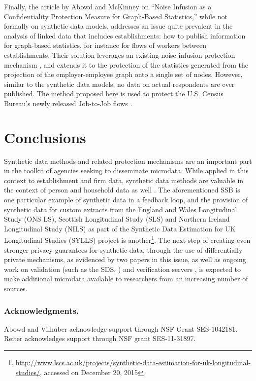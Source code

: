 \documentclass[article,letter]{llncs}
\begin{document}
Finally, the article by Abowd and McKinney on ``Noise Infusion 
as a Confidentiality Protection Measure for Graph-Based Statistics,'' while not formally on synthetic data models, addresses an issue quite prevalent in the analysis of linked data that includes establishments: how to publish information for graph-based statistics, for instance for flows of workers between establishments. Their solution leverages an existing noise-infusion protection mechanism \cite{AbowdEtAl2009}, and extends it to the protection of the statistics generated from the projection of the employer-employee graph onto a single set of nodes. However, similar to the synthetic data models, no data on actual respondents are ever published. The method proposed here is used to protect the U.S. Census Bureau's newly released Job-to-Job flows \cite{J2j-long}. 



\section{Conclusions}

Synthetic data methods and related protection mechanisms are an important part in the toolkit of agencies seeking to disseminate microdata. While applied in this context to establishment and firm data, synthetic data methods are valuable in the context of person and household data as well  \cite{RePEc:bes:jnlasa:v:105:i:492:y:2010:p:1347-1357,2014arXiv1412.2282H}. 
The aforementioned \ac{SSB} \cite{ssafinal} is one particular example of synthetic data in a feedback loop, and the provision of synthetic data for custom extracts from the England and Wales Longitudinal Study (ONS LS), Scottish Longitudinal Study (SLS) and Northern Ireland Longitudinal Study (NILS) as part of the Synthetic Data Estimation for UK Longitudinal Studies (SYLLS) project is another\footnote{\url{http://www.lscs.ac.uk/projects/synthetic-data-estimation-for-uk-longitudinal-studies/}, accessed on December 20, 2015}. The next step of creating even stronger privacy guarantees for synthetic data, through the use of differentially private mechanisms, as evidenced by two papers in this issue, as well as ongoing work on validation (such as the \ac{SDS}, \cite{AbowdVilhuber2010}) and verification servers \cite{Reiter_2009}, is expected to make additional microdata  available to researchers from an increasing number of sources.



\subsubsection*{Acknowledgments.} Abowd and Vilhuber acknowledge support through NSF Grant SES-1042181. Reiter acknowledges support through NSF grant SES-11-31897.


\clearpage


\end{document}
